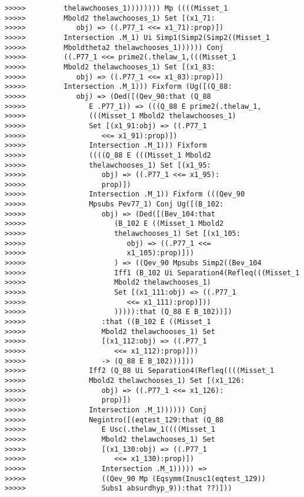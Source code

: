 \documentclass[12pt]{article}
\begin{document}
\begin{verbatim}
>>>>>         thelawchooses_1)))))))) Mp ((((Misset_1
>>>>>         Mbold2 thelawchooses_1) Set [(x1_71:
>>>>>            obj) => ((.P77_1 <<= x1_71):prop)])
>>>>>         Intersection .M_1) Ui Simp1(Simp2(Simp2((Misset_1
>>>>>         Mboldtheta2 thelawchooses_1)))))) Conj
>>>>>         ((.P77_1 <<= prime2(.thelaw_1,(((Misset_1
>>>>>         Mbold2 thelawchooses_1) Set [(x1_83:
>>>>>            obj) => ((.P77_1 <<= x1_83):prop)])
>>>>>         Intersection .M_1))) Fixform (Ug([(Q_88:
>>>>>            obj) => (Ded([(Qev_90:that (Q_88
>>>>>               E .P77_1)) => (((Q_88 E prime2(.thelaw_1,
>>>>>               (((Misset_1 Mbold2 thelawchooses_1)
>>>>>               Set [(x1_91:obj) => ((.P77_1
>>>>>                  <<= x1_91):prop)])
>>>>>               Intersection .M_1))) Fixform
>>>>>               ((((Q_88 E (((Misset_1 Mbold2
>>>>>               thelawchooses_1) Set [(x1_95:
>>>>>                  obj) => ((.P77_1 <<= x1_95):
>>>>>                  prop)])
>>>>>               Intersection .M_1)) Fixform (((Qev_90
>>>>>               Mpsubs Pev77_1) Conj Ug([(B_102:
>>>>>                  obj) => (Ded([(Bev_104:that
>>>>>                     (B_102 E ((Misset_1 Mbold2
>>>>>                     thelawchooses_1) Set [(x1_105:
>>>>>                        obj) => ((.P77_1 <<=
>>>>>                        x1_105):prop)]))
>>>>>                     ) => ((Qev_90 Mpsubs Simp2((Bev_104
>>>>>                     Iff1 (B_102 Ui Separation4(Refleq(((Misset_1
>>>>>                     Mbold2 thelawchooses_1)
>>>>>                     Set [(x1_111:obj) => ((.P77_1
>>>>>                        <<= x1_111):prop)]))
>>>>>                     ))))):that (Q_88 E B_102))])
>>>>>                  :that ((B_102 E ((Misset_1
>>>>>                  Mbold2 thelawchooses_1) Set
>>>>>                  [(x1_112:obj) => ((.P77_1
>>>>>                     <<= x1_112):prop)]))
>>>>>                  -> (Q_88 E B_102)))]))
>>>>>               Iff2 (Q_88 Ui Separation4(Refleq((((Misset_1
>>>>>               Mbold2 thelawchooses_1) Set [(x1_126:
>>>>>                  obj) => ((.P77_1 <<= x1_126):
>>>>>                  prop)])
>>>>>               Intersection .M_1)))))) Conj
>>>>>               Negintro([(eqtest_129:that (Q_88
>>>>>                  E Usc(.thelaw_1((((Misset_1
>>>>>                  Mbold2 thelawchooses_1) Set
>>>>>                  [(x1_130:obj) => ((.P77_1
>>>>>                     <<= x1_130):prop)])
>>>>>                  Intersection .M_1))))) =>
>>>>>                  ((Qev_90 Mp (Eqsymm(Inusc1(eqtest_129))
>>>>>                  Subs1 absurdhyp_9)):that ??)]))

\end{verbatim}
\end{document}
